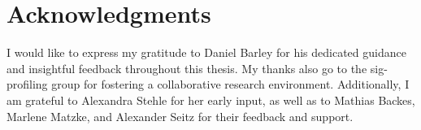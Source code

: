 



\bigskip

\begingroup
\let\clearpage\relax
\let\cleardoublepage\relax
\let\cleardoublepage\relax
\chapter*{Acknowledgments}

I would like to express my gratitude to Daniel Barley for his dedicated guidance and insightful feedback throughout this thesis. My thanks also go to the sig-profiling group for fostering a collaborative research environment. Additionally, I am grateful to Alexandra Stehle for her early input, as well as to Mathias Backes, Marlene Matzke, and Alexander Seitz for their feedback and support.

\endgroup
